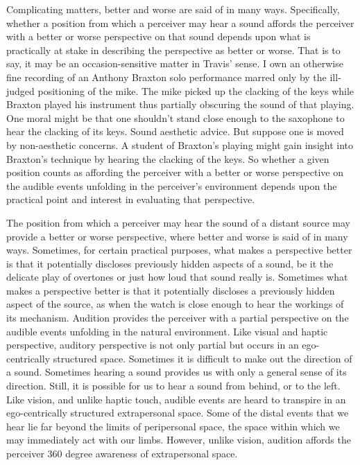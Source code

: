 Complicating matters, better and worse are said of in many ways. Specifically, whether a position from which a perceiver may hear a sound affords the perceiver with a better or worse perspective on that sound depends upon what is practically at stake in describing the perspective as better or worse. That is to say, it may be an occasion-sensitive matter in Travis' \citeyearpar{Travis:2008la} sense. I own an otherwise fine recording of an Anthony Braxton solo performance marred only by the ill-judged positioning of the mike. The mike picked up the clacking of the keys while Braxton played his instrument thus partially obscuring the sound of that playing. One moral might be that one shouldn't stand close enough to the saxophone to hear the clacking of its keys. Sound aesthetic advice. But suppose one is moved by non-aesthetic concerns. A student of Braxton's playing might gain insight into Braxton's technique by hearing the clacking of the keys. So whether a given position counts as affording the perceiver with a better or worse perspective on the audible events unfolding in the perceiver's environment depends upon the practical point and interest in evaluating that perspective.

The position from which a perceiver may hear the sound of a distant source may provide a better or worse perspective, where better and worse is said of in many ways. Sometimes, for certain practical purposes, what makes a perspective better is that it potentially discloses previously hidden aspects of a sound, be it the delicate play of overtones or just how loud that sound really is. Sometimes what makes a perspective better is that it potentially discloses a previously hidden aspect of the source, as when the watch is close enough to hear the workings of its mechanism. Audition provides the perceiver with a partial perspective on the audible events unfolding in the natural environment. Like visual and haptic perspective, auditory perspective is not only partial but occurs in an ego-centrically structured space. Sometimes it is difficult to make out the direction of a sound. Sometimes hearing a sound provides us with only a general sense of its direction. Still, it is possible for us to hear a sound from behind, or to the left. Like vision, and unlike haptic touch, audible events are heard to transpire in an ego-centrically structured extrapersonal space. Some of the distal events that we hear lie far beyond the limits of peripersonal space, the space within which we may immediately act with our limbs. However, unlike vision, audition affords the perceiver 360 degree awareness of extrapersonal space. 



